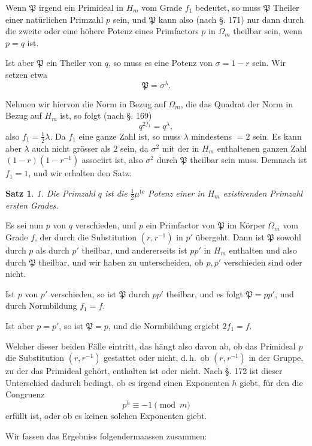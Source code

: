 \documentclass[12pt,a4paper]{article}
\newtheorem*{satz}{Satz}
\begin{document}
Wenn $\mathfrak{P}$ irgend ein Primideal in $H_m$ vom Grade $f_1$ bedeutet, so muss $\mathfrak{P}$ Theiler einer natürlichen Primzahl $p$ sein, und $\mathfrak{P}$ kann also (nach \S. 171) nur dann durch die zweite oder eine höhere Potenz eines Primfactors $p$ in $\Omega_m$ theilbar sein, wenn $p = q$ ist.

Ist aber $\mathfrak{P}$ ein Theiler von $q$, so muss es eine Potenz von $\sigma = 1 - r$ sein. Wir setzen etwa
\[
\mathfrak{P} = \sigma^\lambda.
\]

Nehmen wir hiervon die Norm in Bezug auf $\Omega_m$, die das Quadrat der Norm in Bezug auf $H_m$ ist, so folgt (nach \S. 169)
\[
q^{2f_1} = q^\lambda,
\]
also $f_1 = \frac{1}{2}\lambda$. Da $f_1$ eine ganze Zahl ist, so muss $\lambda$ mindestens $= 2$ sein. Es kann aber $\lambda$ auch nicht grösser als $2$ sein, da $\sigma^2$ mit der in $H_m$ enthaltenen ganzen Zahl $(1-r)(1-r^{-1})$ associirt ist, also $\sigma^2$ durch $\mathfrak{P}$ theilbar sein muss. Demnach ist $f_1 = 1$, und wir erhalten den Satz:

\begin{satz}
1. Die Primzahl $q$ ist die $\frac{1}{2}\mu^{\text{te}}$ Potenz einer in $H_m$ existirenden Primzahl ersten Grades.
\end{satz}

Es sei nun $p$ von $q$ verschieden, und $p$ ein Primfactor von $\mathfrak{P}$ im Körper $\Omega_m$ vom Grade $f$, der durch die Substitution $(r, r^{-1})$ in $p'$ übergeht. Dann ist $\mathfrak{P}$ sowohl durch $p$ als durch $p'$ theilbar, und andererseits ist $pp'$ in $H_m$ enthalten und also durch $\mathfrak{P}$ theilbar, und wir haben zu unterscheiden, ob $p, p'$ verschieden sind oder nicht.

Ist $p$ von $p'$ verschieden, so ist $\mathfrak{P}$ durch $pp'$ theilbar, und es folgt $\mathfrak{P} = pp'$, und durch Normbildung $f_1 = f$.

Ist aber $p = p'$, so ist $\mathfrak{P} = p$, und die Normbildung ergiebt $2f_1 = f$.

Welcher dieser beiden Fälle eintritt, das hängt also davon ab, ob das Primideal $p$ die Substitution $(r, r^{-1})$ gestattet oder nicht, d.\,h.\ ob $(r, r^{-1})$ in der Gruppe, zu der das Primideal gehört, enthalten ist oder nicht. Nach \S. 172 ist dieser Unterschied dadurch bedingt, ob es irgend einen Exponenten $h$ giebt, für den die Congruenz
\[
p^h \equiv -1 \pmod{m}
\]
erfüllt ist, oder ob es keinen solchen Exponenten giebt.

Wir fassen das Ergebniss folgendermaassen zusammen:
\end{document}
